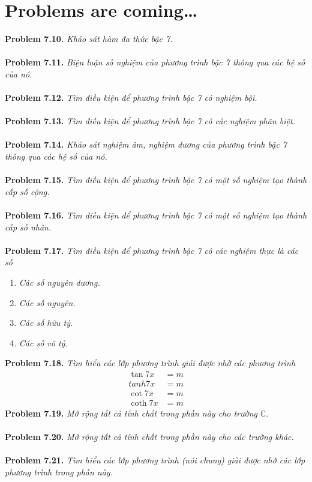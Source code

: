 \documentclass[a4paper,oneside]{book}
\numberwithin{equation}{chapter}
\begin{document}
\section{Problems are coming\ldots}
\textbf{Problem 7.10.} \textit{Khảo sát hàm đa thức bậc 7.}\\
\\
\textbf{Problem 7.11.} \textit{Biện luận số nghiệm của phương trình bậc 7 thông qua các hệ số của nó.}\\
\\
\textbf{Problem 7.12.} \textit{Tìm điều kiện để phương trình bậc 7 có nghiệm bội.}\\
\\
\textbf{Problem 7.13.} \textit{Tìm điều kiện để phương trình bậc 7 có các nghiệm phân biệt.}\\
\\
\textbf{Problem 7.14.} \textit{Khảo sát nghiệm âm, nghiệm dương của phương trình bậc 7 thông qua các hệ số của nó.}\\
\\
\textbf{Problem 7.15.} \textit{Tìm điều kiện để phương trình bậc 7 có một số nghiệm tạo thành cấp số cộng.}\\
\\
\textbf{Problem 7.16.} \textit{Tìm điều kiện để phương trình bậc 7 có một số nghiệm tạo thành cấp số nhân.}\\
\\
\textbf{Problem 7.17.} \textit{Tìm điều kiện để phương trình bậc 7 có các nghiệm thực là các số}
\begin{enumerate}
\item \textit{Các số nguyên dương.}
\item \textit{Các số nguyên.}
\item \textit{Các số hữu tỷ.}
\item \textit{Các số vô tỷ.}
\end{enumerate}
\textbf{Problem 7.18.} \textit{Tìm hiểu các lớp phương trình giải được nhờ các phương trình}
\begin{align}
\tan 7x &= m\\
tanh  7x &= m\\
\cot 7x &= m\\
\coth 7x &= m
\end{align}
\textbf{Problem 7.19.} \textit{Mở rộng tất cả tính chất trong phần này cho trường $\mathbb{C}$}.\\
\\
\textbf{Problem 7.20.} \textit{Mở rộng tất cả tính chất trong phần này cho các trường khác.}\\
\\
\textbf{Problem 7.21.} \textit{Tìm hiểu các lớp phương trình (nói chung) giải được nhờ các lớp phương trình trong phần này.}
\end{document}
